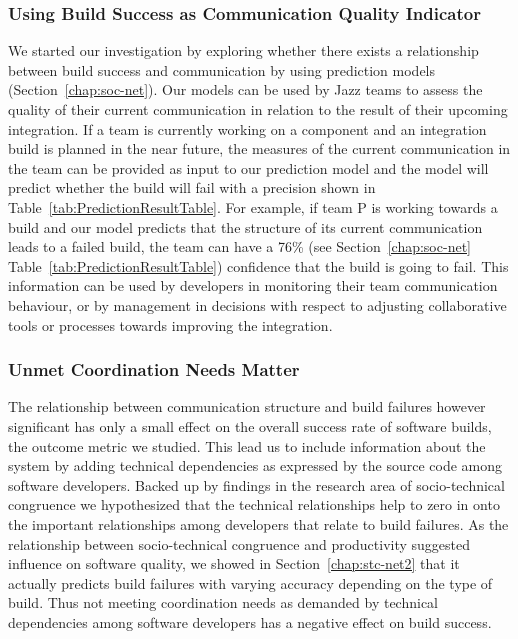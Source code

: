 \subsubsection{Using Build Success as Communication Quality Indicator}
\label{subsec:practicalimpl}
%
We started our investigation by exploring whether there exists a relationship between build success and communication by using prediction models (Section~\ref{chap:soc-net}).
Our models can be used by Jazz teams to assess the quality of their current
communication in relation to the result of their upcoming integration. If a team
is currently working on a component and an integration build is planned in the
near future, the measures of the current communication in the team can be
provided as input to our prediction model and the model will predict whether the
build will fail with a precision shown in Table~\ref{tab:PredictionResultTable}.
For example, if team P is working towards a build and our model predicts that the
structure of its current communication leads to a failed build, the team can have
a 76\% (see Section~\ref{chap:soc-net} Table~\ref{tab:PredictionResultTable}) confidence that the build is
going to fail. This information can be used by developers in monitoring their
team communication behaviour, or by management in decisions with respect to
adjusting collaborative tools or processes towards improving the integration.

\subsubsection{Unmet Coordination Needs Matter}
The relationship between communication structure and build failures however significant has only a small effect on the overall success rate of software builds, the outcome metric we studied.
This lead us to include information about the system by adding technical dependencies as expressed by the source code among software developers.
Backed up by findings in the research area of socio-technical congruence we hypothesized that the technical relationships help to zero in onto the important relationships among developers that relate to build failures.
As the relationship between socio-technical congruence and productivity suggested influence on software quality, we showed in Section~\ref{chap:stc-net2} that it actually predicts build failures with varying accuracy depending on the type of build.
Thus not meeting coordination needs as demanded by technical dependencies among software developers has a negative effect on build success.


